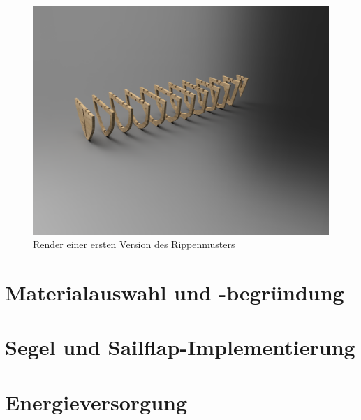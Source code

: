 \begin{figure}[htb]
  \centering
  \includegraphics[width=\textwidth]{assets/rippenv1.png}
  \caption{Render einer ersten Version des Rippenmusters }
  \label{fig:rippenv1}
\end{figure}


\section{Materialauswahl und -begründung }

\section{Segel und Sailflap-Implementierung }
\section{Energieversorgung}